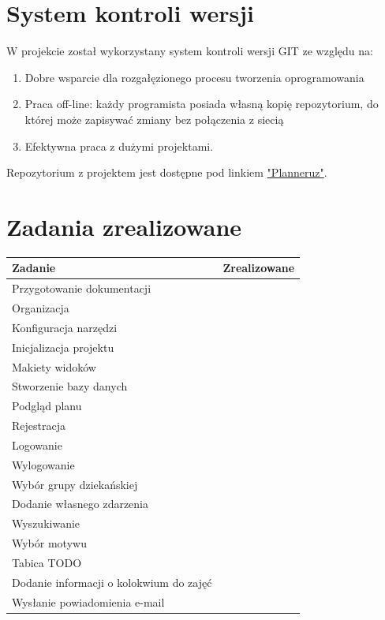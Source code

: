 \documentclass[a4paper,11pt]{uzreport}
\begin{document}
\section{System kontroli wersji}
W projekcie został wykorzystany system kontroli wersji GIT ze względu na: 
	\begin{enumerate}[leftmargin=0.80in]
        	\item Dobre wsparcie dla rozgałęzionego procesu tworzenia oprogramowania
	       	\item Praca off-line: każdy programista posiada własną kopię repozytorium, do której może zapisywać zmiany bez połączenia z siecią      
        	\item Efektywna praca z dużymi projektami.  
    	\end{enumerate}
Repozytorium z projektem jest dostępne pod linkiem \href{https://github.com/stanislawm97/planneruz}{"Planneruz"}.

\section{Zadania zrealizowane}
\begin{center}
\begin{tabular}{ |m{9cm} | m{3cm}| } 
\hline
\textbf{Zadanie} 					& \textbf{Zrealizowane}	\\
\hline
Przygotowanie dokumentacji 			& \checkmark			\\
\hline
Organizacja 						& \checkmark			\\
\hline
Konfiguracja narzędzi 					& \checkmark			\\
\hline
Inicjalizacja projektu					& \checkmark			\\
\hline
Makiety widoków					& \checkmark			\\
\hline
Stworzenie bazy danych 				& \checkmark			\\
\hline
Podgląd planu 						& \checkmark			\\
\hline
Rejestracja 						& \checkmark			\\
\hline
Logowanie 						& \checkmark			\\
\hline
Wylogowanie 						& \checkmark			\\
\hline
Wybór grupy dziekańskiej 				& \checkmark			\\
\hline
Dodanie własnego zdarzenia 			&\\
\hline
Wyszukiwanie 						&\\
\hline
Wybór motywu 						& \checkmark			\\
\hline
Tabica TODO 						&\\
\hline
Dodanie informacji o kolokwium do zajęć 	&\\
\hline
Wysłanie powiadomienia e-mail 			&\\
\hline
\end{tabular}
\end{center}
\end{document}
